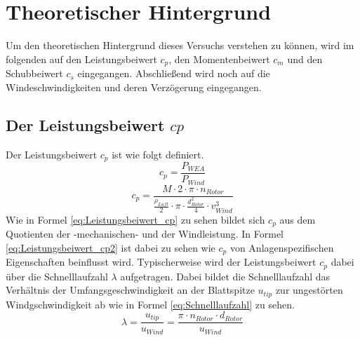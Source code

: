\section{Theoretischer Hintergrund}
Um den theoretischen Hintergrund dieses Versuchs verstehen zu können, wird im folgenden auf den Leistungsbeiwert $c_{p}$, den Momentenbeiwert $c_{m}$ und den Schubbeiwert $c_{s}$ eingegangen. Abschließend wird noch auf die Windeschwindigkeiten und deren Verzögerung eingegangen.
\subsection{Der Leistungsbeiwert $c{p}$}
Der Leistungsbeiwert $c_{p}$ ist wie folgt definiert.
\begin{equation}
  c_{p}= \frac{P_{WEA}}{P_{Wind}}
    \label{eq:Leistungsbeiwert_cp}
\end{equation}
\begin{equation}
  c_{p}= \frac{M \cdot 2 \cdot \pi \cdot n_{Rotor}}{\frac{\rho_{Luft}}{2}\cdot \pi \cdot \frac{d^2_{Rotor}}{4} \cdot v^3_{Wind} }
    \label{eq:Leistungsbeiwert_cp2}
\end{equation}
Wie in Formel \ref{eq:Leistungsbeiwert_cp} zu sehen bildet sich $c_{p}$ aus dem Quotienten der -mechanischen- und der Windleistung. 
In Formel \ref{eq:Leistungsbeiwert_cp2} ist dabei zu sehen wie $c_{p}$ von Anlagenspezifischen Eigenschaften beinflusst wird.
Typischerweise wird der Leistungsbeiwert $c_{p}$ dabei über die Schnelllaufzahl $\lambda$ aufgetragen. Dabei bildet die Schnelllaufzahl das Verhältnis der Umfangsgeschwindigkeit an der Blattspitze $u_{tip}$ zur ungestörten Windgschwindigkeit ab wie in Formel \ref{eq:Schnelllaufzahl} zu sehen.
\begin{equation}
\lambda=\frac{u_{tip}}{u_{Wind}}=\frac{\pi \cdot n_{Rotor}\cdot d_{Rotor}}{u_{Wind}}
    \label{eq:Schnelllaufzahl}
\end{equation}